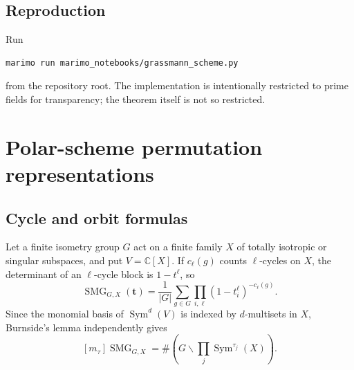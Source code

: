 \documentclass[10pt]{article}
\newcommand{\Sym}{\operatorname{Sym}}
\newcommand{\SMG}{\operatorname{SMG}}
\begin{document}
\subsection{Reproduction}
Run
\begin{verbatim}
marimo run marimo_notebooks/grassmann_scheme.py
\end{verbatim}
from the repository root.  The implementation is intentionally restricted to
prime fields for transparency; the theorem itself is not so restricted.
\endgroup


\clearpage
\section{Polar-scheme permutation representations}\label{proof:polar-schemes}
\begingroup
\providecommand{\Sym}{\operatorname{Sym}}
\renewcommand{\Sym}{\operatorname{Sym}}
\providecommand{\cS}{\SMG}
\renewcommand{\cS}{\SMG}
\setcounter{theorem}{0}
\setcounter{proposition}{0}
\setcounter{lemma}{0}
\setcounter{corollary}{0}
\setcounter{remark}{0}
\begin{abstract}
We prove the fixed-polar-subspace version of the permutation Molien formula
and test two nontrivial actions of the explicitly constructed matrix group
$Sp_4(2)$: isotropic points and maximal totally isotropic $2$-spaces.  The
latter is a rank-two dual-polar scheme.
\end{abstract}

\subsection{Cycle and orbit formulas}
Let a finite isometry group $G$ act on a finite family $X$ of totally
isotropic or singular subspaces, and put $V=\mathbb C[X]$.  If $c_\ell(g)$
counts $\ell$-cycles on $X$, the determinant of an $\ell$-cycle block is
$1-t^\ell$, so
\begin{equation}\label{polar-proof-and-verification:eq:master}
\cS_{G,X}(\mathbf t)=\frac1{|G|}\sum_{g\in G}
\prod_{i,\ell}(1-t_i^\ell)^{-c_\ell(g)}.
\end{equation}
Since the monomial basis of $\Sym^d(V)$ is indexed by $d$-multisets in $X$,
Burnside's lemma independently gives
\begin{equation}\label{polar-proof-and-verification:eq:orbit}
[m_\tau]\cS_{G,X}=\#\left(G\backslash\prod_j\Sym^{\tau_j}(X)\right).
\end{equation}
\end{document}
